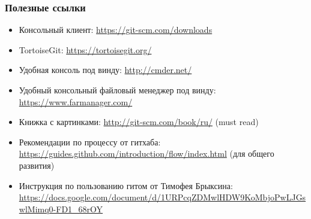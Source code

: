 \documentclass[xetex,mathserif,serif]{beamer}
\begin{document}
    \begin{frame}
        \frametitle{Полезные ссылки}
        \begin{itemize}
            \item Консольный клиент: \url{https://git-scm.com/downloads}
            \item TortoiseGit: \url{https://tortoisegit.org/}
            \item Удобная консоль под винду: \url{http://cmder.net/}
            \item Удобный консольный файловый менеджер под винду: \url{https://www.farmanager.com/}
            \item Книжка с картинками: \url{http://git-scm.com/book/ru/} (must read)
            \item Рекомендации по процессу от гитхаба: \url{https://guides.github.com/introduction/flow/index.html} (для общего развития)
            \item Инструкция по пользованию гитом от Тимофея Брыксина: \url{https://docs.google.com/document/d/1URPcqZDMwlHDW9KoMbjoPwLJGswlMimq0-FD1_68rOY}
        \end{itemize}
    \end{frame}
\end{document}
